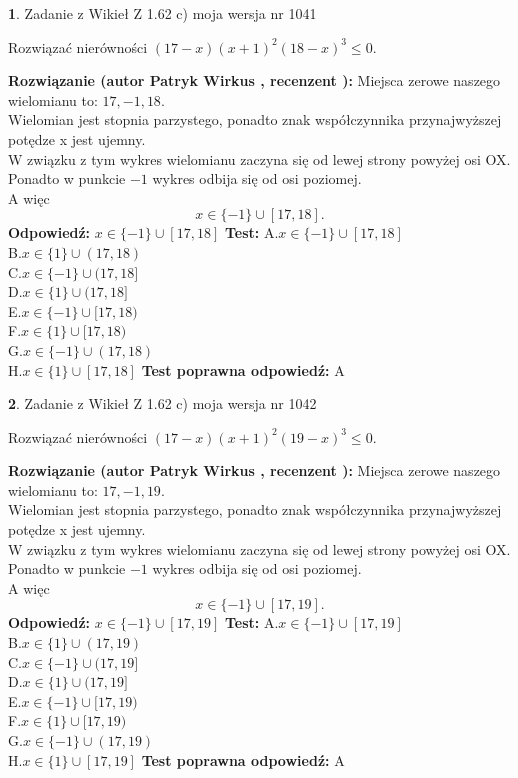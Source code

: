\documentclass[12pt, a4paper]{article}
\theoremstyle{definition} %
\newtheorem{zad}{}
\newcommand{\zadStart}[1]{\begin{zad}#1\newline}
\newcommand{\zadStop}{\end{zad}}
\newcommand{\rozwStart}[2]{\noindent \textbf{Rozwiązanie (autor #1 , recenzent #2): }\newline}
\newcommand{\rozwStop}{\newline}
\newcommand{\odpStart}{\noindent \textbf{Odpowiedź:}\newline}
\newcommand{\odpStop}{\newline}
\newcommand{\testStart}{\noindent \textbf{Test:}\newline}
\newcommand{\testStop}{\newline}
\newcommand{\kluczStart}{\noindent \textbf{Test poprawna odpowiedź:}\newline}
\newcommand{\kluczStop}{\newline}
\begin{document}
\zadStart{Zadanie z Wikieł Z 1.62 c) moja wersja nr 1041}

Rozwiązać nierówności $(17-x)(x+1)^{2}(18-x)^{3}\le0$.
\zadStop
\rozwStart{Patryk Wirkus}{}
Miejsca zerowe naszego wielomianu to: $17, -1, 18$.\\
Wielomian jest stopnia parzystego, ponadto znak współczynnika przy\linebreak najwyższej potędze x jest ujemny.\\ W związku z tym wykres wielomianu zaczyna się od lewej strony powyżej osi OX.\\
Ponadto w punkcie $-1$ wykres odbija się od osi poziomej.\\
A więc $$x \in \{-1\} \cup [17,18].$$
\rozwStop
\odpStart
$x \in \{-1\} \cup [17,18]$
\odpStop
\testStart
A.$x \in \{-1\} \cup [17,18]$\\
B.$x \in \{1\} \cup (17,18)$\\
C.$x \in \{-1\} \cup (17,18]$\\
D.$x \in \{1\} \cup (17,18]$\\
E.$x \in \{-1\} \cup [17,18)$\\
F.$x \in \{1\} \cup [17,18)$\\
G.$x \in \{-1\} \cup (17,18)$\\
H.$x \in \{1\} \cup [17,18]$
\testStop
\kluczStart
A
\kluczStop



\zadStart{Zadanie z Wikieł Z 1.62 c) moja wersja nr 1042}

Rozwiązać nierówności $(17-x)(x+1)^{2}(19-x)^{3}\le0$.
\zadStop
\rozwStart{Patryk Wirkus}{}
Miejsca zerowe naszego wielomianu to: $17, -1, 19$.\\
Wielomian jest stopnia parzystego, ponadto znak współczynnika przy\linebreak najwyższej potędze x jest ujemny.\\ W związku z tym wykres wielomianu zaczyna się od lewej strony powyżej osi OX.\\
Ponadto w punkcie $-1$ wykres odbija się od osi poziomej.\\
A więc $$x \in \{-1\} \cup [17,19].$$
\rozwStop
\odpStart
$x \in \{-1\} \cup [17,19]$
\odpStop
\testStart
A.$x \in \{-1\} \cup [17,19]$\\
B.$x \in \{1\} \cup (17,19)$\\
C.$x \in \{-1\} \cup (17,19]$\\
D.$x \in \{1\} \cup (17,19]$\\
E.$x \in \{-1\} \cup [17,19)$\\
F.$x \in \{1\} \cup [17,19)$\\
G.$x \in \{-1\} \cup (17,19)$\\
H.$x \in \{1\} \cup [17,19]$
\testStop
\kluczStart
A
\kluczStop
\end{document}
